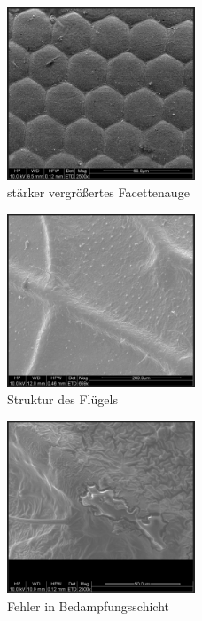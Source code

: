 \documentclass[12pt,english,ngerman]{scrartcl}
\begin{document}
\begin{figure}[H]
	\begin{center}
		\includegraphics[width =0.5\textwidth]{./figures/auge2.png}
	\end{center}
	\caption{stärker vergrößertes Facettenauge}
    \label{fig:auge2}
\end{figure}

\begin{figure}[H]
	\begin{center}
		\includegraphics[width =0.5\textwidth]{./figures/flugel.png}
	\end{center}
	\caption{Struktur des Flügels}
    \label{fig:flugel}
\end{figure}

\begin{figure}[H]
	\begin{center}
		\includegraphics[width =0.5\textwidth]{./figures/damage.png}
	\end{center}
	\caption{Fehler in Bedampfungsschicht}
    \label{fig:damage}
\end{figure}
\end{document}
